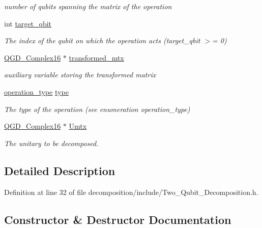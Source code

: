 \begin{DoxyCompactItemize}
\begin{DoxyCompactList}\small\item\em number of qubits spanning the matrix of the operation \end{DoxyCompactList}\item 
int \hyperlink{class_operation_a3e489b72c124b494777c71b1646bb1e9}{target\+\_\+qbit}
\begin{DoxyCompactList}\small\item\em The index of the qubit on which the operation acts (target\+\_\+qbit $>$= 0) \end{DoxyCompactList}\item 
\hyperlink{struct_q_g_d___complex16}{Q\+G\+D\+\_\+\+Complex16} $\ast$ \hyperlink{class_decomposition___base_ae6fa4013266ee6e702b7e645c6bbfed1}{transformed\+\_\+mtx}
\begin{DoxyCompactList}\small\item\em auxiliary variable storing the transformed matrix \end{DoxyCompactList}\item 
\hyperlink{operations_2include_2_operation_8h_ad99e62941c8e4b13e5fc45ecaaf65eff}{operation\+\_\+type} \hyperlink{class_operation_ad47c56c86d62a4c775571e1600416479}{type}
\begin{DoxyCompactList}\small\item\em The type of the operation (see enumeration operation\+\_\+type) \end{DoxyCompactList}\item 
\hyperlink{struct_q_g_d___complex16}{Q\+G\+D\+\_\+\+Complex16} $\ast$ \hyperlink{class_decomposition___base_a61a784aaba39276260b3f73709b51ccc}{Umtx}
\begin{DoxyCompactList}\small\item\em The unitary to be decomposed. \end{DoxyCompactList}\end{DoxyCompactItemize}


\subsection{Detailed Description}


Definition at line 32 of file decomposition/include/\+Two\+\_\+\+Qubit\+\_\+\+Decomposition.\+h.



\subsection{Constructor \& Destructor Documentation}
